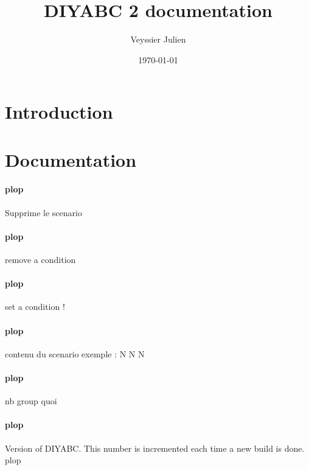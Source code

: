 \documentclass[12pt,a4paper]{article}
\author{Veyssier Julien}
\title{DIYABC 2 documentation}
\date\today
\begin{document}
\maketitle
\newpage

\tableofcontents

\newpage
 

\section{Introduction}

\section{Documentation}
        \paragraph{plop}
        \label{doc_rmScButton}
        Supprime le scenario

        \paragraph{plop}
        \label{doc_rmCondButton}
        remove a condition

        \paragraph{plop}
        \label{doc_setCondButton}
        set a condition !

        \paragraph{plop}
        \label{doc_scplainTextEdit}
        contenu du scenario \newline exemple : \newline N N N

        \paragraph{plop}
        \label{doc_nbGroupLabel}
        nb group quoi

        \paragraph{plop}
        \label{doc_versionLabel}
        Version of DIYABC. This number is incremented each time a new build is done.
        plop
\end{document}
